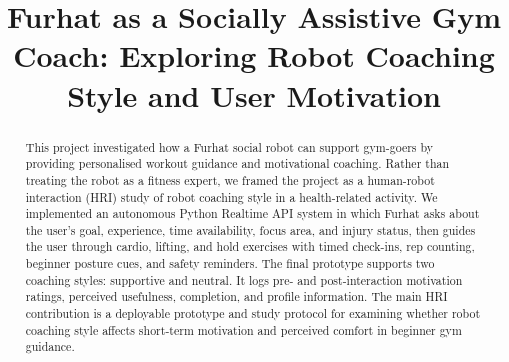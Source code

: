 \documentclass[conference, onecolumn]{IEEEtran}
\begin{document}
\title{Furhat as a Socially Assistive Gym Coach: Exploring Robot Coaching Style and User Motivation}

\author{
\and
{}
\and
{}
\and
{}
\and
{}
}

\maketitle
\begin{abstract}
This project investigated how a Furhat social robot can support gym-goers by providing personalised workout guidance and motivational coaching. Rather than treating the robot as a fitness expert, we framed the project as a human-robot interaction (HRI) study of robot coaching style in a health-related activity. We implemented an autonomous Python Realtime API system in which Furhat asks about the user's goal, experience, time availability, focus area, and injury status, then guides the user through cardio, lifting, and hold exercises with timed check-ins, rep counting, beginner posture cues, and safety reminders. The final prototype supports two coaching styles: supportive and neutral. It logs pre- and post-interaction motivation ratings, perceived usefulness, completion, and profile information. The main HRI contribution is a deployable prototype and study protocol for examining whether robot coaching style affects short-term motivation and perceived comfort in beginner gym guidance.
\end{abstract}
\end{document}
